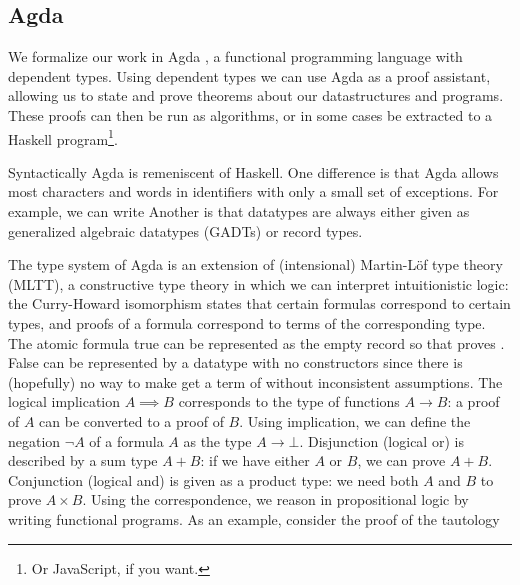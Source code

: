 \subsection{Agda}
We formalize our work in Agda \cite{agda}, a functional programming language with dependent types. Using dependent types we can use Agda as a proof assistant, allowing us to state and prove theorems about our datastructures and programs. These proofs can then be run as algorithms, or in some cases be extracted to a Haskell program\footnote{Or JavaScript, if you want.}.

Syntactically Agda is remeniscent of Haskell. One difference is that Agda allows most characters and words in identifiers with only a small set of exceptions. For example, we can write
Another is that datatypes are always either given as generalized algebraic datatypes (GADTs) or record types.

The type system of Agda is an extension of (intensional) Martin-Löf type theory (MLTT), a constructive type theory in which we can interpret intuitionistic logic: the Curry-Howard isomorphism states that certain formulas correspond to certain types, and proofs of a formula correspond to terms of the corresponding type. The atomic formula true can be represented as the empty record
so that  proves . False can be represented by a datatype with no constructors
since there is (hopefully) no way to make get a term of  without inconsistent assumptions. The logical implication $A \implies B$ corresponds to the type of functions $A \to B$: a proof of $A$ can be converted to a proof of $B$. Using implication, we can define the negation $\lnot A$ of a formula $A$ as the type $A \to \bot$. Disjunction (logical or) is described by a sum type $A + B$:
if we have either $A$ or $B$, we can prove $A + B$. Conjunction (logical and) is given as a product type:
we need both $A$ and $B$ to prove $A \times B$. Using the correspondence, we reason in propositional logic by writing functional programs. As an example, consider the proof of the tautology 

